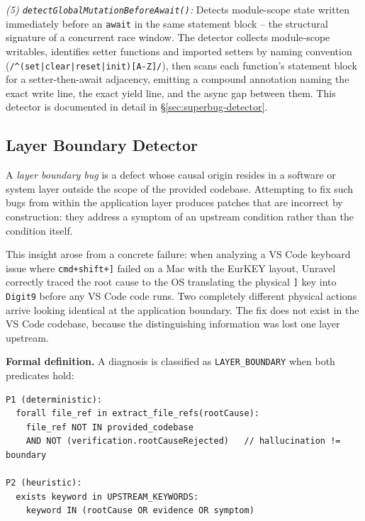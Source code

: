 \documentclass[12pt,a4paper]{article}
\newcommand{\code}[1]{\texttt{\small #1}}
\begin{document}
\textit{(5) \code{detectGlobalMutationBeforeAwait()}:} Detects module-scope state
written immediately before an \code{await} in the same statement block -- the
structural signature of a concurrent race window. The detector collects module-scope
writables, identifies setter functions and imported setters by naming convention
(\code{/\^{}(set|clear|reset|init)[A-Z]/}), then scans each function's statement
block for a setter-then-await adjacency, emitting a compound annotation naming the
exact write line, the exact yield line, and the async gap between them. This detector
is documented in detail in \S\ref{sec:superbug-detector}.

\subsection{Layer Boundary Detector}

\begin{defbox}[title={Definition: Layer Boundary Bug}]
\small
A \textit{layer boundary bug} is a defect whose causal origin resides in a software or
system layer outside the scope of the provided codebase. Attempting to fix such bugs from
within the application layer produces patches that are incorrect by construction: they
address a symptom of an upstream condition rather than the condition itself.
\end{defbox}

This insight arose from a concrete failure: when analyzing a VS Code keyboard issue where
\texttt{cmd+shift+]} failed on a Mac with the EurKEY layout, Unravel correctly traced the
root cause to the OS translating the physical \texttt{]} key into \texttt{Digit9} before
any VS Code code runs. Two completely different physical actions arrive looking identical at
the application boundary. The fix does not exist in the VS Code codebase, because the
distinguishing information was lost one layer upstream.

\textbf{Formal definition.} A diagnosis is classified as \code{LAYER\_BOUNDARY} when both
predicates hold:

\begin{lstlisting}[language={}, style=code]
P1 (deterministic):
  forall file_ref in extract_file_refs(rootCause):
    file_ref NOT IN provided_codebase
    AND NOT (verification.rootCauseRejected)   // hallucination != boundary

P2 (heuristic):
  exists keyword in UPSTREAM_KEYWORDS:
    keyword IN (rootCause OR evidence OR symptom)
\end{lstlisting}
\end{document}
